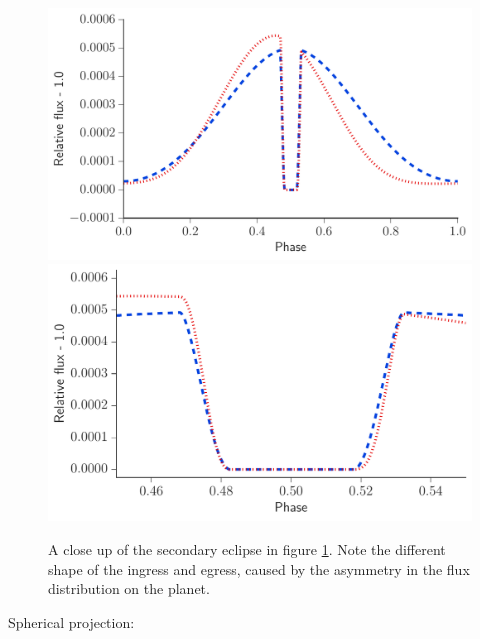 \documentclass[a4paper,fleqn,usenatbib]{mnras}
\begin{document}
\begin{figure}
\begin{center}
\includegraphics[width=\columnwidth]{img/both_lc.pdf}
\includegraphics[width=\columnwidth]{img/both_lc_zoom.pdf}
\caption{A close up of the secondary eclipse in figure \ref{fig:ex_lcs}. Note the different shape of the ingress and egress, caused by the asymmetry in the flux distribution on the planet.}
\label{fig:ex_lcs}
\end{center}
\end{figure}

Spherical projection:
\end{document}
